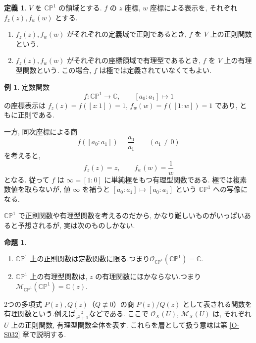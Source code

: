 \documentclass[dvipdfmx,a4paper,11pt]{article} %
\newcommand{\C}{\mathbb{C}}
\theoremstyle{definition}
\numberwithin{equation}{section}
\newtheorem{prop}[thm]{命題}
\newtheorem{dfn}[thm]{定義}
\newtheorem{exa}[thm]{例}
\begin{document}
\begin{dfn}\label{O-M018}
$V$ を $\C\mathbb P^1$ の領域とする.
$f$ の $z$ 座標, $w$ 座標による表示を, それぞれ $f_z(z),f_w(w)$ とする.
\begin{enumerate}
\item $f_z(z),f_w(w)$ がそれぞれの定義域で正則であるとき, 
$f$ を $V$ 上の正則関数という.
\item $f_z(z),f_w(w)$ がそれぞれの座標領域で有理型であるとき, 
$f$ を $V$ 上の有理型関数という.
この場合, $f$ は極では定義されていなくてもよい.
\end{enumerate}
\end{dfn}

\begin{exa}
定数関数
\[
f:\C\mathbb P^1\longrightarrow\C,\qquad [a_0:a_1]\longmapsto1
\]
の座標表示は $f_z(z)=f([z:1])=1$, $f_w(w)=f([1:w])=1$ であり,
ともに正則である.

一方, 同次座標による商
\[
f([a_0:a_1])=\frac{a_0}{a_1}\qquad(a_1\neq0)
\]
を考えると,
\[
f_z(z)=z,\qquad f_w(w)=\frac1w
\]
となる. 従って $f$ は $\infty=[1:0]$ に単純極をもつ有理型関数である.
極では複素数値を取らないが, 値 $\infty$ を補うと
$[a_0:a_1]\mapsto[a_0:a_1]$ という $\C\mathbb P^1$ への写像になる.
\end{exa}

$\C\mathbb P^1$ で正則関数や有理型関数を考えるのだから, かなり難しいものがいっぱいあると予想されるが, 実は次のものしかない.



\begin{prop}\label{O-M022}
\begin{enumerate}
\item $\C\mathbb P^1$ 上の正則関数は定数関数に限る.つまり$\mathcal O_{\C\mathbb P^1}(\C\mathbb P^1)=\C{}$.
\item $\C\mathbb P^1$ 上の有理型関数は, $z$ の有理関数にほかならない.つまり$\mathcal M_{\C\mathbb P^1}(\C\mathbb P^1)=\C{}(z)$.
\end{enumerate}
\end{prop}

2つの多項式 $P(z),Q(z)$（$Q\not\equiv 0$）の商 $P(z)/Q(z)$ として表される関数を有理関数という.例えば$\frac{z}{z^2+1}$などである. 
ここで $\mathcal O_X(U)$, $\mathcal M_X(U)$ は, それぞれ
$U$ 上の正則関数, 有理型関数全体を表す.
これらを層として扱う意味は第 \ref{O-S032} 章で説明する.
\end{document}
